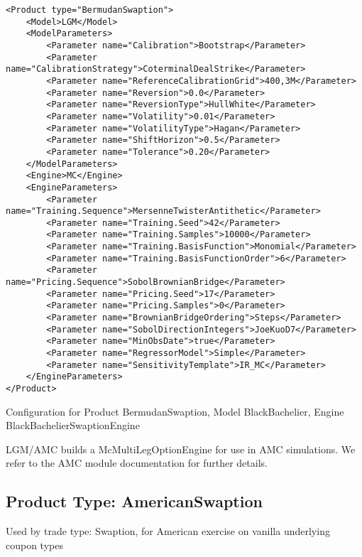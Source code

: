 \begin{longlisting}
\begin{verbatim}
<Product type="BermudanSwaption">
    <Model>LGM</Model>
    <ModelParameters>
        <Parameter name="Calibration">Bootstrap</Parameter>
        <Parameter name="CalibrationStrategy">CoterminalDealStrike</Parameter>
        <Parameter name="ReferenceCalibrationGrid">400,3M</Parameter>
        <Parameter name="Reversion">0.0</Parameter>
        <Parameter name="ReversionType">HullWhite</Parameter>
        <Parameter name="Volatility">0.01</Parameter>
        <Parameter name="VolatilityType">Hagan</Parameter>
        <Parameter name="ShiftHorizon">0.5</Parameter>
        <Parameter name="Tolerance">0.20</Parameter>
    </ModelParameters>
    <Engine>MC</Engine>
    <EngineParameters>
        <Parameter name="Training.Sequence">MersenneTwisterAntithetic</Parameter>
        <Parameter name="Training.Seed">42</Parameter>
        <Parameter name="Training.Samples">10000</Parameter>
        <Parameter name="Training.BasisFunction">Monomial</Parameter>
        <Parameter name="Training.BasisFunctionOrder">6</Parameter>
        <Parameter name="Pricing.Sequence">SobolBrownianBridge</Parameter>
        <Parameter name="Pricing.Seed">17</Parameter>
        <Parameter name="Pricing.Samples">0</Parameter>
        <Parameter name="BrownianBridgeOrdering">Steps</Parameter>
        <Parameter name="SobolDirectionIntegers">JoeKuoD7</Parameter>
        <Parameter name="MinObsDate">true</Parameter>
        <Parameter name="RegressorModel">Simple</Parameter>
        <Parameter name="SensitivityTemplate">IR_MC</Parameter>
    </EngineParameters>
</Product>
\end{verbatim}
\caption{Configuration for Product BermudanSwaption, Model BlackBachelier, Engine BlackBachelierSwaptionEngine}
\label{lst:peconfig_BermudanSwaption_LGM_MC}
\end{longlisting}

LGM/AMC builds a McMultiLegOptionEngine for use in AMC simulations. We refer to the AMC module documentation for further
details.

\subsection{Product Type: AmericanSwaption}

Used by trade type: Swaption, for American exercise on vanilla underlying coupon types


